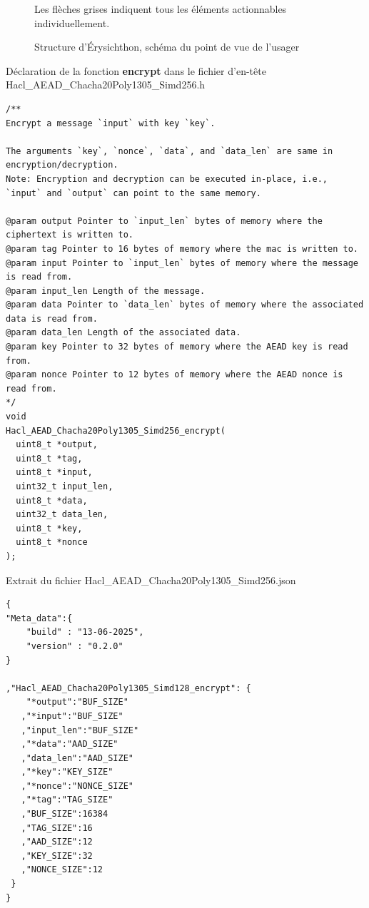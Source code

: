 \begin{figure}[!ht]
  \caption{Structure d'Érysichthon, schéma du point de vue de l'usager}
  \label{fig:erysichthon_structure}
  \small
  Les flèches grises indiquent tous les éléments actionnables individuellement.
\end{figure}

\newpage
\begin{listing}[!ht]
  \caption{Déclaration de la fonction \textbf{encrypt} dans le fichier d'en-tête Hacl\_AEAD\_\-Chacha20Poly1305\_Simd256.h}
  \label{lst:exemple_header}
  \begin{verbatim}
/**
Encrypt a message `input` with key `key`.

The arguments `key`, `nonce`, `data`, and `data_len` are same in encryption/decryption.
Note: Encryption and decryption can be executed in-place, i.e.,
`input` and `output` can point to the same memory.

@param output Pointer to `input_len` bytes of memory where the ciphertext is written to.
@param tag Pointer to 16 bytes of memory where the mac is written to.
@param input Pointer to `input_len` bytes of memory where the message is read from.
@param input_len Length of the message.
@param data Pointer to `data_len` bytes of memory where the associated data is read from.
@param data_len Length of the associated data.
@param key Pointer to 32 bytes of memory where the AEAD key is read from.
@param nonce Pointer to 12 bytes of memory where the AEAD nonce is read from.
*/
void
Hacl_AEAD_Chacha20Poly1305_Simd256_encrypt(
  uint8_t *output,
  uint8_t *tag,
  uint8_t *input,
  uint32_t input_len,
  uint8_t *data,
  uint32_t data_len,
  uint8_t *key,
  uint8_t *nonce
);
  \end{verbatim}
\end{listing}

\vfill
\begin{listing}[!htb]
  \caption{Extrait du fichier Hacl\_AEAD\_Chacha20Poly1305\_Simd256.json}
  \label{lst:exemple_json}
  \begin{verbatim}
{
"Meta_data":{
    "build" : "13-06-2025",
    "version" : "0.2.0"
}

,"Hacl_AEAD_Chacha20Poly1305_Simd128_encrypt": {
    "*output":"BUF_SIZE"
   ,"*input":"BUF_SIZE"
   ,"input_len":"BUF_SIZE"
   ,"*data":"AAD_SIZE"
   ,"data_len":"AAD_SIZE"
   ,"*key":"KEY_SIZE"
   ,"*nonce":"NONCE_SIZE"
   ,"*tag":"TAG_SIZE"
   ,"BUF_SIZE":16384
   ,"TAG_SIZE":16
   ,"AAD_SIZE":12
   ,"KEY_SIZE":32
   ,"NONCE_SIZE":12
 }
}
  \end{verbatim}
\end{listing}

